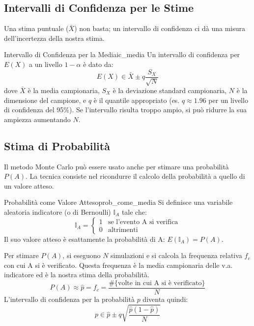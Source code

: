\subsection{Intervalli di Confidenza per le Stime}
Una stima puntuale (\(\bar{X}\)) non basta; un intervallo di confidenza ci dà
una misura dell'incertezza della nostra stima.

\begin{proposizione}{Intervallo di Confidenza per la Media}{ic_media}
Un intervallo di confidenza per \(E(X)\) a un livello \(1-\alpha\) è dato da:
\[
E(X) \in \bar{X} \pm q \frac{S_X}{\sqrt{N}}
\]
dove \(\bar{X}\) è la media campionaria, \(S_X\) è la deviazione standard
campionaria, \(N\) è la dimensione del campione, e \(q\) è il quantile
appropriato (es. \(q \approx 1.96\) per un livello di confidenza del 95\%). Se
l'intervallo risulta troppo ampio, si può ridurre la sua ampiezza aumentando
\(N\).
\end{proposizione}


\subsection{Stima di Probabilità}
Il metodo Monte Carlo può essere usato anche per stimare una probabilità
\(P(A)\). La tecnica consiste nel ricondurre il calcolo della probabilità a
quello di un valore atteso.

\begin{nota}{Probabilità come Valore Atteso}{prob_come_media}
Si definisce una variabile aleatoria indicatore (o di Bernoulli)
\(\mathbb{I}_A\) tale che:
\[
\mathbb{I}_A = \begin{cases} 1 & \text{se l'evento A si verifica} \\ 0 &
\text{altrimenti} \end{cases}
\]
Il suo valore atteso è esattamente la probabilità di A: \(E(\mathbb{I}_A) =
P(A)\).
\end{nota}

Per stimare \(P(A)\), si eseguono \(N\) simulazioni e si calcola la frequenza
relativa \(f_c\) con cui A si è verificato. Questa frequenza è la media
campionaria delle v.a. indicatore ed è la nostra stima della probabilità.
\[
P(A) \approx \hat{p} = f_c = \frac{\#\{ \text{volte in cui A si è verificato}
\}}{N}
\]
L'intervallo di confidenza per la probabilità \(p\) diventa quindi:
\[
p \in \hat{p} \pm q \sqrt{\frac{\hat{p}(1-\hat{p})}{N}}
\]
